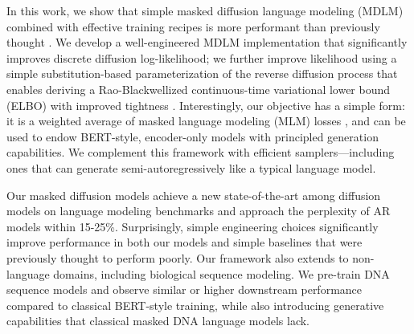 \documentclass{article} %
\begin{document}
In this work, we show that simple masked diffusion language modeling (MDLM) combined with effective training recipes 
is more performant than previously thought \citep{austin2021structured,he2022diffusionbert,zheng2023reparameterized}.
We develop a well-engineered MDLM implementation that significantly improves discrete diffusion log-likelihood; we further improve likelihood using a simple substitution-based parameterization of the reverse diffusion process that enables
deriving a Rao-Blackwellized continuous-time variational lower bound (ELBO) with improved tightness \cite{sahoo2023backpropagation}.
Interestingly, our objective has a simple form: it is a weighted average of masked language modeling (MLM) losses \citep{devlin2018bert}, and can be used to endow BERT-style, encoder-only models with principled generation capabilities.
We complement this framework with efficient samplers---including ones that can generate semi-autoregressively like a typical language model.

Our masked diffusion models achieve a new state-of-the-art among diffusion models on language modeling benchmarks and approach the perplexity of AR models within 15-25\%. 
Surprisingly, simple engineering choices significantly improve performance in both our models and simple baselines that were previously thought to perform poorly.
Our framework also extends to non-language domains, including biological sequence modeling.
We pre-train DNA sequence models and observe  similar or higher  downstream performance compared to classical BERT-style training, while also introducing generative capabilities that classical masked DNA language models lack.
\end{document}
